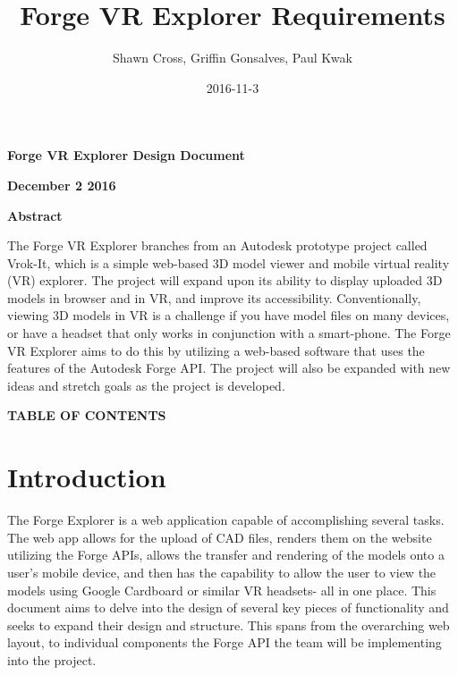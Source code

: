 \documentclass[letterpaper, 10pt, draftclsnofoot, compsoc, onecolumn]{IEEEtran}
\title{Forge VR Explorer Requirements}
\author{Shawn Cross, Griffin Gonsalves, Paul Kwak}
\date{2016-11-3}
\begin{document}
\clearpage\setcounter{page}{1}\pagestyle{Standard}
\thispagestyle{FirstPage}

\bigskip

{\centering{}\bfseries\color{black}
Forge VR Explorer Design Document
\par}

\bigskip

{\centering{}\bfseries\color{black}
December 2 2016
\par}
\bigskip
\bigskip
\bigskip
\bigskip
\bigskip
\bigskip
\bigskip
\bigskip
\bigskip
\bigskip
\bigskip
\bigskip

\vfill
{\centering{}\bfseries\color{black}
Abstract
\par}

{\centering{}\mdseries\color{black}
	The Forge VR Explorer branches from an Autodesk prototype project called Vrok-It, which is a simple web-based 3D 
	model viewer and mobile virtual reality (VR) explorer. The project will expand upon its ability to display uploaded 3D 
	models in browser and in VR, and improve its accessibility. Conventionally, viewing 3D models in VR is a challenge if 
	you have model files on many devices, or have a headset that only works in conjunction with a smart-phone. The 
	Forge VR Explorer aims to do this by utilizing a web-based software that uses the features of the Autodesk Forge API. 
	The project will also be expanded with new ideas and stretch goals as the project is developed.
\par}
\clearpage
{\centering{}\bfseries\color{black}
TABLE OF CONTENTS
\par}

\bigskip

\setcounter{tocdepth}{2}
\renewcommand\contentsname{}
\tableofcontents

\bigskip
\clearpage

\section{Introduction}
The Forge Explorer is a web application capable of accomplishing several tasks. The web app allows for the upload of CAD files, renders them on the website utilizing the Forge APIs, allows the transfer and rendering of the models onto a user's mobile device, and then has the capability to allow the user to view the models using Google Cardboard or similar VR headsets- all in one place. This document aims to delve into the design of several key pieces of functionality and seeks to expand their design and structure. This spans from the overarching web layout, to individual components the Forge API the team will be implementing into the project.
\end{document}
